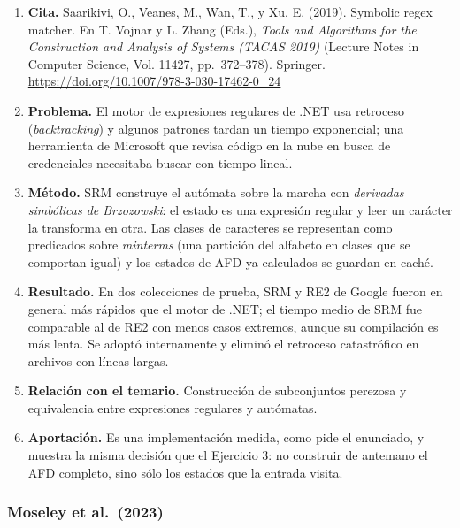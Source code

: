 \begin{enumerate}
\def\labelenumi{\arabic{enumi}.}
\tightlist
\item
  \textbf{Cita.} Saarikivi, O., Veanes, M., Wan, T., y Xu, E. (2019). Symbolic regex matcher. En T. Vojnar y L. Zhang (Eds.), \emph{Tools and Algorithms for the Construction and Analysis of Systems (TACAS 2019)} (Lecture Notes in Computer Science, Vol. 11427, pp.~372--378). Springer. \url{https://doi.org/10.1007/978-3-030-17462-0_24}
\item
  \textbf{Problema.} El motor de expresiones regulares de .NET usa retroceso (\emph{backtracking}) y algunos patrones tardan un tiempo exponencial; una herramienta de Microsoft que revisa código en la nube en busca de credenciales necesitaba buscar con tiempo lineal.
\item
  \textbf{Método.} SRM construye el autómata sobre la marcha con \emph{derivadas simbólicas de Brzozowski}: el estado es una expresión regular y leer un carácter la transforma en otra. Las clases de caracteres se representan como predicados sobre \emph{minterms} (una partición del alfabeto en clases que se comportan igual) y los estados de AFD ya calculados se guardan en caché.
\item
  \textbf{Resultado.} En dos colecciones de prueba, SRM y RE2 de Google fueron en general más rápidos que el motor de .NET; el tiempo medio de SRM fue comparable al de RE2 con menos casos extremos, aunque su compilación es más lenta. Se adoptó internamente y eliminó el retroceso catastrófico en archivos con líneas largas.
\item
  \textbf{Relación con el temario.} Construcción de subconjuntos perezosa y equivalencia entre expresiones regulares y autómatas.
\item
  \textbf{Aportación.} Es una implementación medida, como pide el enunciado, y muestra la misma decisión que el Ejercicio 3: no construir de antemano el AFD completo, sino sólo los estados que la entrada visita.
\end{enumerate}

\hypertarget{moseley-et-al.-2023}{%
\subsubsection{Moseley et al.~(2023)}\label{moseley-et-al.-2023}}

